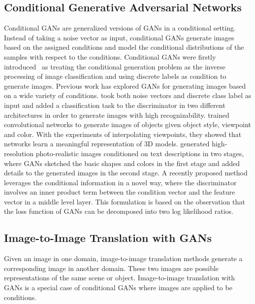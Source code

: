 \subsection{Conditional Generative Adversarial Networks}

Conditional GANs are generalized versions of GANs in a conditional setting. 
Instead of taking a noise vector as input, conditional GANs generate images based on the assigned conditions and model the conditional distributions of the samples with respect to the conditions. 
%
Conditional GANs were firstly introduced~\cite{cGANs} as treating the conditional generation problem as the inverse processing of image classification and using discrete labels as condition to generate images. 
Previous work has explored GANs for generating images based on a wide variety of conditions.
\cite{InfoGANs, ACGANs} took both noise vectors and discrete class label as input and added a classification task to the discriminator in two different architectures in order to generate images with high recognizability.   
%
\cite{3DGANs} trained convolutional networks to generate images of objects given object style, viewpoint and color. With the experiments of interpolating viewpoints, they showed that networks learn a meaningful representation of 3D models. 
%
\cite{StackGANs, StackGANs++} generated high-resolution photo-realistic images conditioned on text descriptions in two stages, where GANs sketched the basic shapes and colors in the first stage and added details to the generated images in the second stage.  
%
A recently proposed method~\cite{cGAN-projection} leverages the conditional information in a novel way, where the discriminator involves an inner product term between the condition vector and the feature vector in a middle level layer. This formulation is based on the observation that the loss function of GANs can be decomposed into two log likelihood ratios.
%
%
%
\subsection{Image-to-Image Translation with GANs}
Given an image in one domain, image-to-image translation methods generate a corresponding image in another domain. These two images are possible representations of the same scene or object. 
Image-to-image translation with GANs is a special case of conditional GANs where images are applied to be conditions. 
%

